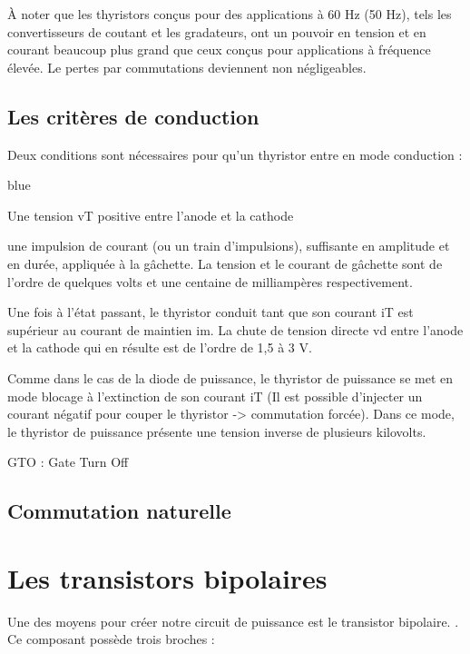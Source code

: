 À noter que les thyristors conçus pour des applications à 60 Hz (50 Hz), tels les
convertisseurs de coutant et les gradateurs, ont un pouvoir en tension et en courant
beaucoup plus grand que ceux conçus pour applications à fréquence élevée. Le pertes par commutations deviennent non négligeables.

\subsection{Les critères de conduction}

Deux conditions sont nécessaires pour qu’un thyristor entre en mode conduction : 


\begin{items}{blue}{\Triangle}
  \item Une tension vT positive entre l’anode et la cathode
  \item une impulsion de courant (ou un train
  d’impulsions), suffisante en amplitude et en durée, appliquée à la gâchette. La tension
  et le courant de gâchette sont de l’ordre de quelques volts et une centaine de
  milliampères respectivement. \\
\end{items}

Une fois à l’état passant, le thyristor conduit tant que son courant iT est supérieur au
courant de maintien im. La chute de tension directe vd entre l’anode et la cathode qui en
résulte est de l’ordre de 1,5 à 3 V.


Comme dans le cas de la diode de puissance, le thyristor de puissance se met en mode
blocage à l’extinction de son courant iT (Il est possible d'injecter un courant négatif pour couper le thyristor -> commutation forcée). Dans ce mode, le thyristor de puissance
présente une tension inverse de plusieurs kilovolts.

GTO : Gate Turn Off


\subsection{Commutation naturelle}



\section{Les transistors bipolaires}

Une des moyens pour créer notre circuit de puissance est le transistor bipolaire. . Ce composant possède trois broches : 

